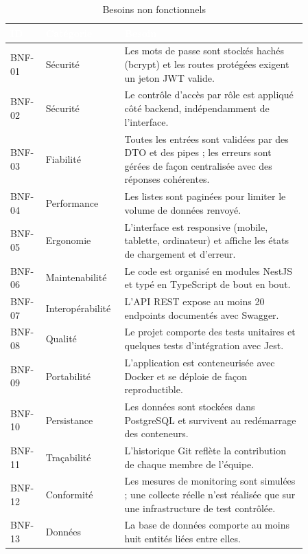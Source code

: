 \documentclass[11pt,a4paper]{article}
\begin{document}
\begin{center}
\renewcommand{\arraystretch}{1.3}
\begin{longtable}{|L{0.10\linewidth}|L{0.18\linewidth}|L{0.58\linewidth}|}
\hline
{}
\textcolor{white}{\textbf{ID}} & \textcolor{white}{\textbf{Catégorie}} & \textcolor{white}{\textbf{Besoin}} \\
\hline
\endhead
\caption{Besoins non fonctionnels}
\label{tab:bnf}
\endlastfoot
BNF-01 & Sécurité & Les mots de passe sont stockés hachés (bcrypt) et les routes
protégées exigent un jeton JWT valide. \\ \hline
BNF-02 & Sécurité & Le contrôle d'accès par rôle est appliqué côté backend,
indépendamment de l'interface. \\ \hline
BNF-03 & Fiabilité & Toutes les entrées sont validées par des DTO et des pipes ; les
erreurs sont gérées de façon centralisée avec des réponses cohérentes. \\ \hline
BNF-04 & Performance & Les listes sont paginées pour limiter le volume de données
renvoyé. \\ \hline
BNF-05 & Ergonomie & L'interface est responsive (mobile, tablette, ordinateur) et
affiche les états de chargement et d'erreur. \\ \hline
BNF-06 & Maintenabilité & Le code est organisé en modules NestJS et typé en
TypeScript de bout en bout. \\ \hline
BNF-07 & Interopérabilité & L'API REST expose au moins 20 endpoints documentés avec
Swagger. \\ \hline
BNF-08 & Qualité & Le projet comporte des tests unitaires et quelques tests
d'intégration avec Jest. \\ \hline
BNF-09 & Portabilité & L'application est conteneurisée avec Docker et se déploie de
façon reproductible. \\ \hline
BNF-10 & Persistance & Les données sont stockées dans PostgreSQL et survivent au
redémarrage des conteneurs. \\ \hline
BNF-11 & Traçabilité & L'historique Git reflète la contribution de chaque membre de
l'équipe. \\ \hline
BNF-12 & Conformité & Les mesures de monitoring sont simulées ; une collecte
réelle n'est réalisée que sur une infrastructure de test contrôlée. \\ \hline
BNF-13 & Données & La base de données comporte au moins huit entités liées entre
elles. \\ \hline
\end{longtable}
\end{center}
\end{document}
